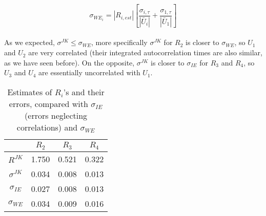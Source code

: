 \documentclass{article}
\begin{document}
\begin{equation}
\sigma_{WE_i} = \left|R_{i,est}\right| \left[ \frac{\sigma_{i,\tau}}{\left|\bar U_i \right|} + \frac{\sigma_{1,\tau}}{\left|\bar U_1 \right|} \right]
\end{equation}\\
As we expected, $\sigma^{JK} \leq \sigma _{WE}$, more specifically $\sigma^{JK}$ for $R_2$ is closer to $\sigma _{WE}$,
so $U_1$ and $U_2$ are very correlated (their integrated autocorrelation times are also similar, as we have seen before).
On the opposite, $\sigma^{JK}$ is closer to $\sigma _{IE}$ for $R_3$ and $R_4$, so $U_3$ and $U_4$ are
essentially uncorrelated with $U_1$.
\begin{table}[ht]
    \centering
    \begin{tabular}{|c|c|c|c|}
    \hline
    & $R_2$ & $R_3$ & $R_4$  \\
    \hline
    $R^{JK}$ & 1.750 & 0.521 &0.322 \\
    \hline
    $\sigma^{JK}$ & 0.034 & 0.008 & 0.013 \\
    \hline
    $\sigma_{IE}$  & 0.027 & 0.008 & 0.013 \\
    \hline
    $\sigma _{WE}$ & 0.034 & 0.009 & 0.016  \\
    \hline
\end{tabular}
\caption{Estimates of $R_i$'s and their errors, compared with $\sigma_{IE}$(errors neglecting correlations)
and $\sigma_{WE}$}
\end{table}
\end{document}
